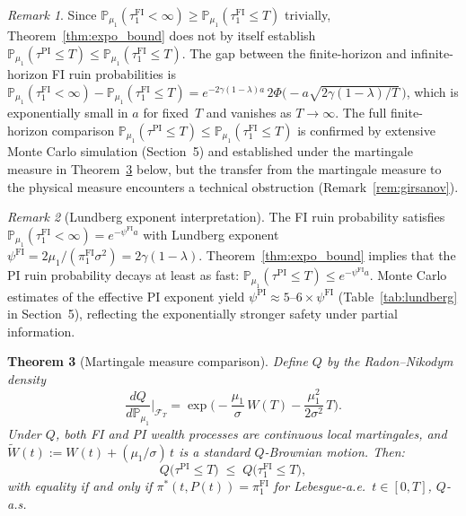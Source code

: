 \documentclass[12pt]{article}
\newtheorem{theorem}{Theorem}[section]
\theoremstyle{remark}
\newtheorem{remark}[theorem]{Remark}
\theoremstyle{definition}
\newcommand{\Prob}{\mathbb{P}}
\newcommand{\FI}{\mathrm{FI}}
\newcommand{\PI}{\mathrm{PI}}
\begin{document}
\begin{remark}\label{rem:expo_interpret}
Since $\Prob_{\mu_1}(\tau_1^{\FI} < \infty)
  \ge \Prob_{\mu_1}(\tau_1^{\FI} \le T)$ trivially,
Theorem~\ref{thm:expo_bound} does not by itself establish
$\Prob_{\mu_1}(\tau^{\PI} \le T) \le \Prob_{\mu_1}(\tau_1^{\FI} \le T)$.
The gap between the finite-horizon and infinite-horizon FI ruin
probabilities is
$\Prob_{\mu_1}(\tau_1^{\FI} < \infty) - \Prob_{\mu_1}(\tau_1^{\FI} \le T)
  = e^{-2\gamma(1-\lambda)a}\,
  2\Phi\bigl(-a\sqrt{2\gamma(1-\lambda)/T}\,\bigr)$,
which is exponentially small in $a$ for fixed~$T$ and vanishes as
$T \to \infty$.
The full finite-horizon comparison
$\Prob_{\mu_1}(\tau^{\PI} \le T) \le \Prob_{\mu_1}(\tau_1^{\FI} \le T)$
is confirmed by extensive Monte Carlo simulation (Section~5) and
established under the martingale measure in
Theorem~\ref{thm:Q_comparison} below, but the transfer from the
martingale measure to the physical measure encounters a technical
obstruction (Remark~\ref{rem:girsanov}).
\end{remark}

\begin{remark}[Lundberg exponent interpretation]
\label{rem:lundberg}
The FI ruin probability satisfies
$\Prob_{\mu_1}(\tau_1^{\FI} < \infty) = e^{-\psi^{\FI} a}$
with Lundberg exponent
$\psi^{\FI} = 2\mu_1/(\pi_1^{\FI}\sigma^2) = 2\gamma(1-\lambda)$.
Theorem~\ref{thm:expo_bound} implies that the PI ruin probability
decays at least as fast:
$\Prob_{\mu_1}(\tau^{\PI} \le T) \le e^{-\psi^{\FI} a}$.
Monte Carlo estimates of the effective PI exponent yield
$\psi^{\PI} \approx 5$--$6 \times \psi^{\FI}$
(Table~\ref{tab:lundberg} in Section~5), reflecting the
exponentially stronger safety under partial information.
\end{remark}

\begin{theorem}[Martingale measure comparison]
\label{thm:Q_comparison}
Define $Q$ by the Radon--Nikodym density
\begin{equation}\label{eq:Q_density}
  \frac{dQ}{d\Prob_{\mu_1}}\bigg|_{\mathcal{F}_T}
  = \exp\!\biggl(-\frac{\mu_1}{\sigma}\,W(T)
    - \frac{\mu_1^2}{2\sigma^2}\,T\biggr).
\end{equation}
Under $Q$, both FI and PI wealth processes are continuous local
martingales, and $\widetilde{W}(t) := W(t) + (\mu_1/\sigma)\,t$ is a
standard $Q$-Brownian motion.
Then:
\begin{equation}\label{eq:Q_comp}
  Q\bigl(\tau^{\PI} \le T\bigr) \;\le\; Q\bigl(\tau_1^{\FI} \le T\bigr),
\end{equation}
with equality if and only if
$\pi^*(t, P(t)) = \pi_1^{\FI}$ for Lebesgue-a.e.\ $t \in [0,T]$,
$Q$-a.s.
\end{theorem}
\end{document}
